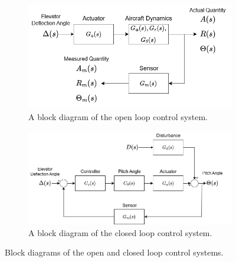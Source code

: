 \documentclass[10pt,a4paper]{article}
\begin{document}
    \begin{figure}[h]
        \begin{subfigure}[h]{0.5\textwidth}
            \centering
            \includegraphics[width = \textwidth]{figs/ELE2038_H5_openLoopBlockDiagram.drawio.png}
            \caption{A block diagram of the open loop control system.}
            \label{fig:ol_blockDiagram}            
        \end{subfigure}%
        \begin{subfigure}[h]{0.5\textwidth}
            \centering
            \includegraphics[width = \textwidth]{figs/ELE2038_H5_closedLoopBlockDiagram.drawio.png}
            \caption{A block diagram of the closed loop control system.}
            \label{fig:cl_blockDiagram}
        \end{subfigure}
    \caption{Block diagrams of the open and closed loop control systems.}
    \end{figure}
    
\end{document}
